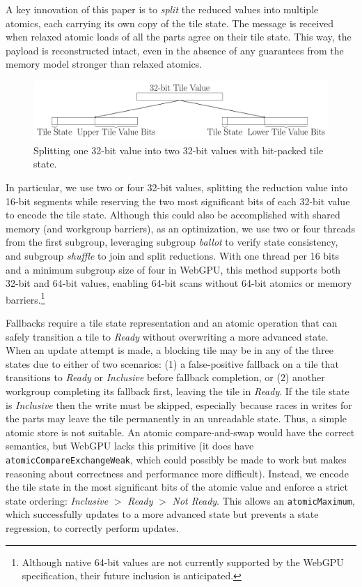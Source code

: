 \documentclass[acmsmall, manuscript, screen, review, anonymous]{acmart}
\begin{document}
A key innovation of this paper is to \emph{split} the reduced values into multiple atomics, each carrying its own copy of the tile state. The message is received when relaxed atomic loads of all the parts agree on their tile state. This way, the payload is reconstructed intact, even in the absence of any guarantees from the memory model stronger than relaxed atomics.

\begin{figure}[h!]
  \centering
  \includegraphics[width=\linewidth]{graphics/split.pdf}
  \caption{Splitting one 32-bit value into two 32-bit values with bit-packed tile state.}
\end{figure}

In particular, we use two or four 32-bit values, splitting the reduction value into 16-bit segments while reserving the two most significant bits of each 32-bit value to encode the tile state. Although this could also be accomplished with shared memory (and workgroup barriers), as an optimization, we use two or four threads from the first subgroup, leveraging subgroup \emph{ballot} to verify state consistency, and subgroup \emph{shuffle} to join and split reductions. With one thread per 16 bits and a minimum subgroup size of four in WebGPU, this method supports both 32-bit and 64-bit values, enabling 64-bit scans without 64-bit atomics or memory barriers.\footnote{Although native 64-bit values are not currently supported by the WebGPU specification, their future inclusion is anticipated.}

Fallbacks require a tile state representation and an atomic operation that can safely transition a tile to \emph{Ready} without overwriting a more advanced state. When an update attempt is made, a blocking tile may be in any of the three states due to either of two scenarios: (1) a false-positive fallback on a tile that transitions to \emph{Ready} or \emph{Inclusive} before fallback completion, or (2) another workgroup completing its fallback first, leaving the tile in \emph{Ready}. If the tile state is \emph{Inclusive} then the write must be skipped, especially because races in writes for the parts may leave the tile permanently in an unreadable state. Thus, a simple atomic store is not suitable. An atomic compare-and-swap would have the correct semantics, but WebGPU lacks this primitive (it does have \texttt{atomicCompareExchangeWeak}, which could possibly be made to work but makes reasoning about correctness and performance more difficult). Instead, we encode the tile state in the most significant bits of the atomic value and enforce a strict state ordering: \emph{Inclusive} $>$ \emph{Ready} $>$ \emph{Not Ready}. This allows an \texttt{atomicMaximum}, which successfully updates to a more advanced state but prevents a state regression, to correctly perform updates.
\end{document}

